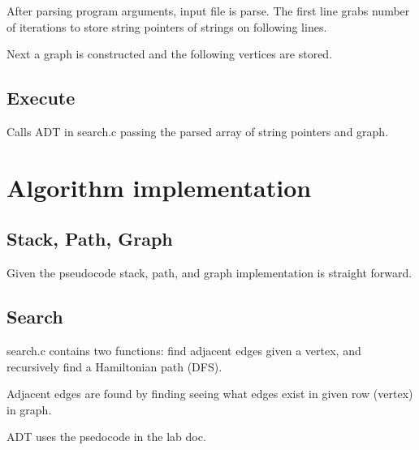 \documentclass[12pt]{article}
\begin{document}
	After parsing program arguments, input file is parse.
	The first line grabs number of iterations to store string pointers of strings on following lines.

	Next a graph is constructed and the following vertices are stored.

	\subsection{Execute}

	Calls ADT in search.c passing the parsed array of string pointers and graph.

	\section{Algorithm implementation}

	\subsection{Stack, Path, Graph}

	Given the pseudocode stack, path, and graph implementation is straight forward.

	\subsection{Search}

	search.c contains two functions: find adjacent edges given a vertex, and recursively find a Hamiltonian path (DFS).

	Adjacent edges are found by finding seeing what edges exist in given row (vertex) in graph.

	ADT uses the psedocode in the lab doc.

	
\end{document}
